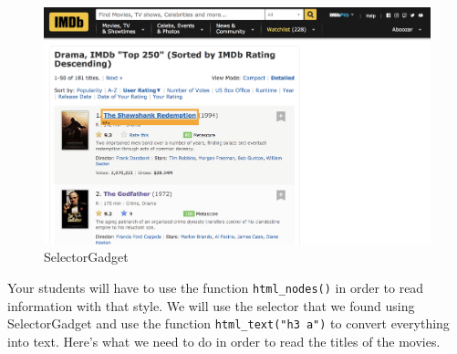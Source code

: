 \documentclass[]{book}
\newenvironment{Shaded}{\begin{snugshade}}{\end{snugshade}}
\newcommand{\KeywordTok}[1]{\textcolor[rgb]{0.13,0.29,0.53}{\textbf{#1}}}
\newcommand{\NormalTok}[1]{#1}
\newcommand{\OperatorTok}[1]{\textcolor[rgb]{0.81,0.36,0.00}{\textbf{#1}}}
\newcommand{\StringTok}[1]{\textcolor[rgb]{0.31,0.60,0.02}{#1}}
\begin{document}
\begin{figure}
\centering
\includegraphics{./images/selector_gadget.png}
\caption{SelectorGadget}
\end{figure}

Your students will have to use the function \texttt{html\_nodes()} in order to read information with that style. We will use the selector that we found using SelectorGadget and use the function \texttt{html\_text("h3\ a")} to convert everything into text. Here's what we need to do in order to read the titles of the movies.

\begin{Shaded}
\end{Shaded}
\end{document}
